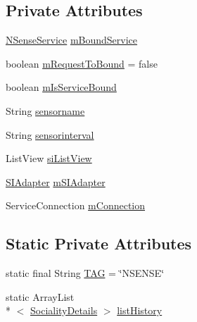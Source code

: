 \subsection*{Private Attributes}
\begin{DoxyCompactItemize}
\item 
\hyperlink{classcs_1_1nsense_1_1_n_sense_service}{N\-Sense\-Service} \hyperlink{classcs_1_1nsense_1_1_n_sense_activity_a6a48a71c3cd0c5da40bd62196d5ff07b}{m\-Bound\-Service}
\item 
boolean \hyperlink{classcs_1_1nsense_1_1_n_sense_activity_a434e53ab6841f0f85cbaec01bbf99811}{m\-Request\-To\-Bound} = false
\item 
boolean \hyperlink{classcs_1_1nsense_1_1_n_sense_activity_a9c152811e5c46167941994003e30ffe1}{m\-Is\-Service\-Bound}
\item 
String \hyperlink{classcs_1_1nsense_1_1_n_sense_activity_a634d40b37a27c90ebeac668d4cc3a809}{sensorname}
\item 
String \hyperlink{classcs_1_1nsense_1_1_n_sense_activity_a72e35d65f34da9bd3a1b34ad3208c0b6}{sensorinterval}
\item 
List\-View \hyperlink{classcs_1_1nsense_1_1_n_sense_activity_aca33368b7b96f27d8ca7a445264bdca9}{si\-List\-View}
\item 
\hyperlink{classcs_1_1nsense_1_1_s_i_adapter}{S\-I\-Adapter} \hyperlink{classcs_1_1nsense_1_1_n_sense_activity_a3a2e7482cff1bcc969c39b9b672cec60}{m\-S\-I\-Adapter}
\item 
Service\-Connection \hyperlink{classcs_1_1nsense_1_1_n_sense_activity_aa8df1068177c5acdb37d8aac72263297}{m\-Connection}
\end{DoxyCompactItemize}
\subsection*{Static Private Attributes}
\begin{DoxyCompactItemize}
\item 
static final String \hyperlink{classcs_1_1nsense_1_1_n_sense_activity_a30a12082155068187f1dbd5ef495c923}{T\-A\-G} = \char`\"{}N\-S\-E\-N\-S\-E\char`\"{}
\item 
static Array\-List\\*
$<$ \hyperlink{classcs_1_1nsense_1_1inference_module_1_1_sociality_details}{Sociality\-Details} $>$ \hyperlink{classcs_1_1nsense_1_1_n_sense_activity_ad32b6b007a685bd0a3aa74ae80f5bec6}{list\-History}
\end{DoxyCompactItemize}


